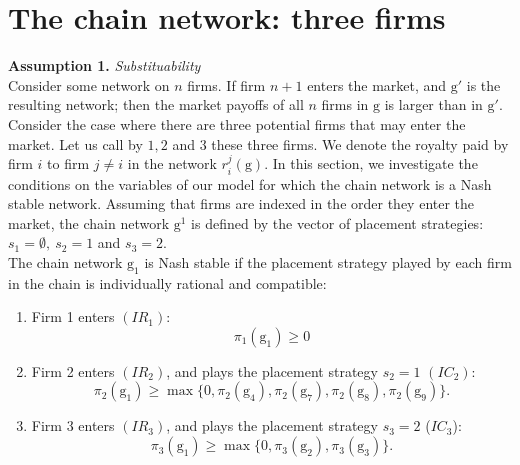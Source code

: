 \documentclass{article}
\begin{document}
\section{The chain network: three firms}
\textbf{Assumption 1.} \textit{Substituability}\\
\indent Consider some network  on $n$ firms. If firm $n+1$ enters the market, and $\text{g}'$ is the resulting network; then the market payoffs of all $n$ firms in $\text{g}$ is larger than in $\text{g}'$. \\ 

\indent Consider the case where there are three potential firms that may enter the market. Let us call by $1,2$ and $3$ these three firms. We denote the royalty paid by firm $i$ to firm $j\neq i$ in the network  $r^{j}_i(\text{g})$. In this section, we investigate the conditions on the variables of our model for which the chain network is a Nash stable network. Assuming that firms are indexed in the order they enter the market, the chain network $\text{g}^1$ is defined by the vector of placement strategies: $s_1=\emptyset, ~s_2=1$ and $s_3=2$. \\
\indent The chain network $\text{g}_1$ is Nash stable if the placement strategy played by each firm in the chain is individually rational and compatible: 
\begin{enumerate}
    \item Firm 1 enters $(IR_1)$:
    \begin{equation*}
        \pi_1(\text{g}_1)\geq 0
    \end{equation*}
    \item Firm 2 enters $(IR_2)$, and plays the placement strategy $s_2=1$ $(IC_2)$: 
    \begin{equation*}
        \pi_2(\text{g}_1) \geq \max \{0, \pi_2(\text{g}_4), \pi_2(\text{g}_7), \pi_2(\text{g}_8),\pi_2(\text{g}_9)\}.
    \end{equation*}
    \item Firm 3 enters $(IR_3)$, and plays the placement strategy $s_3=2$ ($IC_3$):
    \begin{equation*}
        \pi_3(\text{g}_1)\geq \max\{0, \pi_3(\text{g}_2), \pi_3(\text{g}_3)\}.  
    \end{equation*}
\end{enumerate}
\end{document}
